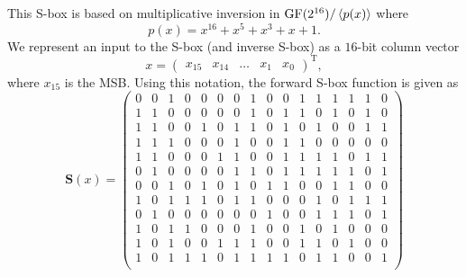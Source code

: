 This S-box is based on multiplicative inversion in $\mathrm{GF}(2^{16}) / \left\langle p(x) \right\rangle$ where 
\begin{equation*}
p(x) = x^{16} + x^5 + x^3 + x + 1.
\end{equation*}
We represent an input to the S-box (and inverse S-box) as a $16$-bit column vector 
\begin{equation*}
x = 
\begin{pmatrix}
x_{15} & x_{14} & \ldots & x_1 & x_0
\end{pmatrix}^\mathrm{T},
\end{equation*}
where $x_{15}$ is the MSB.
Using this notation, the forward S-box function is given as
\begin{equation*}
\renewcommand{\arraystretch}{0.7} %
\mathbf{S}(x) = 
\begin{pmatrix}
0 & 0 & 1 & 0 & 0 & 0 & 0 & 1 & 0 & 0 & 1 & 1 & 1 & 1 & 1 & 0 \\
1 & 1 & 0 & 0 & 0 & 0 & 0 & 1 & 0 & 1 & 1 & 0 & 1 & 0 & 1 & 0 \\
1 & 1 & 0 & 0 & 1 & 0 & 1 & 1 & 0 & 1 & 0 & 1 & 0 & 0 & 1 & 1 \\
1 & 1 & 1 & 0 & 0 & 0 & 1 & 0 & 0 & 1 & 1 & 0 & 0 & 0 & 0 & 0 \\

1 & 1 & 0 & 0 & 0 & 1 & 1 & 0 & 0 & 1 & 1 & 1 & 1 & 0 & 1 & 1 \\
0 & 1 & 0 & 0 & 0 & 0 & 1 & 1 & 0 & 1 & 1 & 1 & 1 & 1 & 0 & 1 \\
0 & 0 & 1 & 0 & 1 & 0 & 1 & 0 & 1 & 1 & 0 & 0 & 1 & 1 & 0 & 0 \\
1 & 0 & 1 & 1 & 1 & 0 & 1 & 1 & 0 & 0 & 0 & 1 & 0 & 1 & 1 & 1 \\

0 & 1 & 0 & 0 & 0 & 0 & 0 & 0 & 1 & 0 & 0 & 1 & 1 & 1 & 0 & 1 \\
1 & 0 & 1 & 1 & 0 & 0 & 0 & 1 & 0 & 0 & 1 & 0 & 1 & 0 & 0 & 0 \\
1 & 0 & 1 & 0 & 0 & 1 & 1 & 1 & 0 & 0 & 1 & 1 & 0 & 1 & 0 & 0 \\
1 & 0 & 1 & 1 & 1 & 0 & 1 & 1 & 1 & 1 & 0 & 1 & 1 & 0 & 0 & 1 \\


\end{pmatrix}
\end{equation*}
